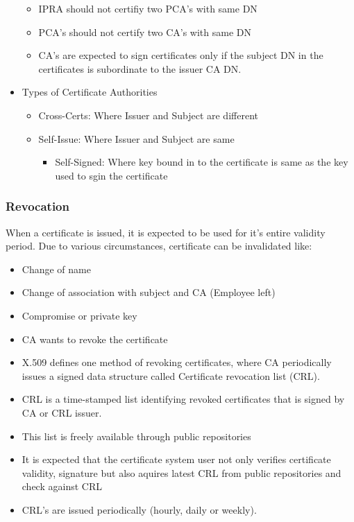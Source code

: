 \documentclass[a4paper]{article}
\begin{document}
\begin{itemize}
\begin{itemize}
                    \item IPRA should not certifiy two PCA's with same DN
                    \item PCA's should not certify two CA's with same DN
                    \item CA's are expected to sign certificates only if the subject DN in the
                        certificates is subordinate to the issuer CA DN.
                \end{itemize}
            \item Types of Certificate Authorities
                \begin{itemize}
                    \item Cross-Certs: Where Issuer and Subject are different
                    \item Self-Issue: Where Issuer and Subject are same
                        \begin{itemize}
                            \item Self-Signed: Where key bound in to the certificate is same as the key used to sgin the certificate
                        \end{itemize}
                \end{itemize}
        \end{itemize}
    \subsubsection{Revocation}
        When a certificate is issued, it is expected to be used for it's entire validity period. Due to various circumstances, certificate can be invalidated like:
        \begin{itemize}
            \item Change of name
            \item Change of association with subject and CA (Employee left)
            \item Compromise or private key
            \item CA wants to revoke the certificate
        \end{itemize}
        \begin{itemize}
            \item X.509 defines one method of revoking certificates, where CA periodically issues a signed data structure called Certificate revocation list (CRL).
            \item CRL is a time-stamped list identifying revoked certificates that is signed by CA or CRL issuer. 
            \item This list is freely available through public repositories
            \item It is expected that the certificate system user not only verifies certificate validity, signature but also aquires latest CRL from public repositories and check against CRL
            \item CRL's are issued periodically (hourly, daily or weekly). 
        \end{itemize}
\end{document}
